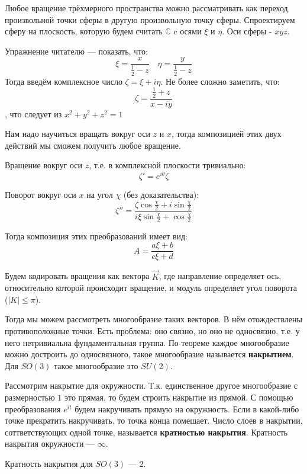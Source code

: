 Любое вращение трёхмерного пространства можно рассматривать как переход произвольной точки сферы
в другую произвольную точку сферы.
Спроектируем сферу на плоскость, которую будем считать \(\mathbb{C}\) c осями \(\xi\) и \(\eta\). Оси сферы - \(xyz\).

Упражнение читателю --- показать, что:
\[\xi = \frac{x}{\frac{1}{2} - z} \quad \eta = \frac{y}{\frac{1}{2} - z}\]
Тогда введём комплексное число \(\zeta = \xi + i\eta\). Не более сложно заметить, что:
\[\zeta = \frac{\frac{1}{2} + z}{x - iy}\]
, что следует из \(x^2+y^2+z^2=1\)

Нам надо научиться вращать вокруг оси \(z\) и \(x\), тогда композицией этих двух действий мы сможем получить любое вращение.

Вращение вокруг оси \(z\), т.е. в комплексной плоскости тривиально:
\[\zeta' = e^{i\theta} \zeta\]

Поворот вокруг оси \(x\) на угол \(\chi\) (без доказательства):
\[\zeta'' = \frac{\zeta \cos \frac{\chi}{2} + i \sin \frac{\chi}{2}}{i \xi \sin \frac{\chi}{2} + \cos \frac{\chi}{2}}\]

Тогда композиция этих преобразований имеет вид:
\[A = \frac{a\xi + b}{c\xi + d}\]

Будем кодировать вращения как вектора \(\vec{K}\), где направление определяет ось,
относительно которой происходит вращение, и модуль определяет угол поворота (\(|K| \le \pi\)).

Тогда мы можем рассмотреть многообразие таких векторов. В нём отождествлены противоположные точки.
Есть проблема: оно связно, но оно не односвязно, т.е. у него нетривиальна фундаментальная группа.
По теореме каждое многообразие можно достроить до односвязного, такое многообразие называется \textbf{накрытием}.
Для \(SO(3)\) такое многообразие это \(SU(2)\).

\begin{example}
	Рассмотрим накрытие для окружности.
	Т.к. единственное другое многообразие с размерностью \(1\) это прямая, то будем строить накрытие из прямой.
	С помощью преобразования \(e^{it}\) будем накручивать прямую на окружность.
	Если в какой-либо точке прекратить накручивать, то точка конца помешает.
	Число слоев в накрытии, соттветствующих одной точке, называется \textbf{кратностью накрытия}.
	Кратность накрытия окружности --- \(\infty\).
\end{example}

Кратность накрытия для \(SO(3)\) --- \(2\).
